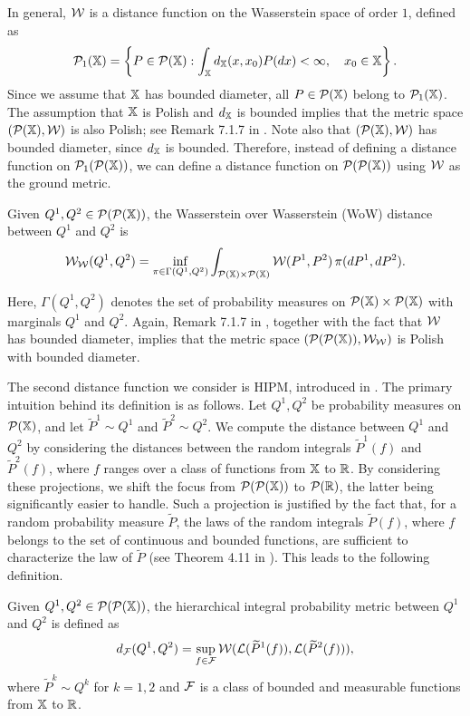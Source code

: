 In general, $\mathcal{W}$ is a distance function on the Wasserstein space of order $1$, defined as
\[
\mathcal{P}_1(\mathbb{X}) = \left\{P \in \mathcal{P}(\mathbb{X}) : \int_{\mathbb{X}} d_{\mathbb{X}}(x, x_0) P(dx) < \infty, \quad x_0 \in \mathbb{X} \right\}.
\]
Since we assume that $\mathbb{X}$ has bounded diameter, all $P \in \mathcal{P}(\mathbb{X})$ belong to $\mathcal{P}_1(\mathbb{X})$. The assumption that $\mathbb{X}$ is Polish and $d_{\mathbb{X}}$ is bounded implies that the metric space $(\mathcal{P}(\mathbb{X}), \mathcal{W})$ is also Polish; see Remark 7.1.7 in \cite{luigi2008gradient}. Note also that $(\mathcal{P}(\mathbb{X}), \mathcal{W})$ has bounded diameter, since $d_{\mathbb{X}}$ is bounded. Therefore, instead of defining a distance function on $\mathcal{P}_1(\mathcal{P}(\mathbb{X}))$, we can define a distance function on $\mathcal{P}(\mathcal{P}(\mathbb{X}))$ using $\mathcal{W}$ as the ground metric.

\begin{definition}
    \label{definition:wow}
    Given $Q^1, Q^2 \in \mathcal{P}(\mathcal{P}(\mathbb{X}))$, the Wasserstein over Wasserstein (WoW) distance between $Q^1$ and $Q^2$ is
    \[
    \mathcal{W}_{\mathcal{W}}(Q^1, Q^2) = \inf_{\pi \in \Gamma(Q^1, Q^2)} \int_{\mathcal{P}(\mathbb{X}) \times \mathcal{P}(\mathbb{X})} \mathcal{W}(P^1, P^2) \, \pi(dP^1, dP^2).
    \]
\end{definition}
Here, $\Gamma(Q^1,Q^2)$ denotes the set of probability measures on $\mathcal{P}(\mathbb{X}) \times \mathcal{P}(\mathbb{X})$ with marginals $Q^1$ and $Q^2$. Again, Remark 7.1.7 in \cite{luigi2008gradient}, together with the fact that $\mathcal{W}$ has bounded diameter, implies that the metric space $(\mathcal{P}(\mathcal{P}(\mathbb{X})), \mathcal{W}_{\mathcal{W}})$ is Polish with bounded diameter.

The second distance function we consider is HIPM, introduced in \cite{catalano2024hierarchical}. The primary intuition behind its definition is as follows. Let $Q^1, Q^2$ be probability measures on $\mathcal{P}(\mathbb{X})$, and let $\widetilde{P}^1 \sim Q^1$ and $\widetilde{P}^2 \sim Q^2$. We compute the distance between $Q^1$ and $Q^2$ by considering the distances between the random integrals $\widetilde{P}^1(f)$ and $\widetilde{P}^2(f)$, where $f$ ranges over a class of functions from $\mathbb{X}$ to $\mathbb{R}$. By considering these projections, we shift the focus from $\mathcal{P}(\mathcal{P}(\mathbb{X}))$ to $\mathcal{P}(\mathbb{R})$, the latter being significantly easier to handle. Such a projection is justified by the fact that, for a random probability measure $\widetilde{P}$, the laws of the random integrals $\widetilde{P}(f)$, where $f$ belongs to the set of continuous and bounded functions, are sufficient to characterize the law of $\widetilde{P}$ (see Theorem 4.11 in \cite{kallenberg2017random}). This leads to the following definition.

\begin{definition}
    \label{definition:hipm}
    Given $Q^1, Q^2 \in \mathcal{P}(\mathcal{P}(\mathbb{X}))$, the hierarchical integral probability metric between $Q^1$ and $Q^2$ is defined as
    \[
    d_{\mathcal{F}}(Q^1, Q^2) = \sup_{f \in \mathcal{F}} \mathcal{W}(\mathcal{L}(\widetilde{P}^1(f)), \mathcal{L}(\widetilde{P}^2(f))),
    \]
    where $\widetilde{P}^k \sim Q^k$ for $k=1,2$ and $\mathcal{F}$ is a class of bounded and measurable functions from $\mathbb{X}$ to $\mathbb{R}$.
\end{definition}

